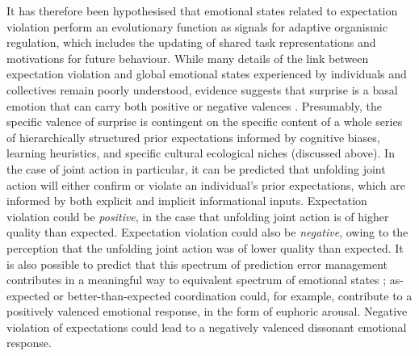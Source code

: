 It has therefore been hypothesised that emotional states related to expectation violation perform an evolutionary function as signals for adaptive organismic regulation, which includes the updating of shared task representations and motivations for future behaviour\citep{Cosmides2000,Barrett2017}.  While many details of the link between expectation violation and global emotional states experienced by individuals and collectives remain poorly understood, evidence suggests that surprise is a basal emotion that can carry both positive or negative valences \citep{Ortony1990}. Presumably, the specific valence of surprise is contingent on the specific content of a whole series of hierarchically structured prior expectations informed by cognitive biases, learning heuristics, and specific cultural ecological niches (discussed above).  In the case of joint action in particular, it can be predicted that unfolding joint action will either confirm or violate an individual's prior expectations, which are informed by both explicit and implicit informational inputs.
Expectation violation could be \textit{positive}, in the case that unfolding joint action is of higher quality than expected.  Expectation violation could also be \textit{negative}, owing to the perception that the unfolding joint action was of lower quality than expected.  It is also possible to predict that this spectrum of prediction error management contributes in a meaningful way to equivalent spectrum of emotional states \citep{Pessoa2014};  as-expected or better-than-expected coordination could, for example, contribute to a positively valenced emotional response, in the form of euphoric arousal.  Negative violation of expectations could lead to a negatively valenced dissonant emotional response.


